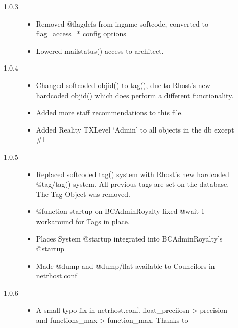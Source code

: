 \documentclass[letterpaper,10pt,english]{sphinxmanual}
\begin{document}
\begin{description}
\begin{description}
\begin{itemize}
\end{itemize}

\item[{1.0.3}] \leavevmode\begin{itemize}
\item {} 
\sphinxAtStartPar
Removed @flagdefs from in\sphinxhyphen{}game softcode, converted to flag\_access\_*
config options

\item {} 
\sphinxAtStartPar
Lowered mailstatus() access to architect.

\end{itemize}

\item[{1.0.4}] \leavevmode\begin{itemize}
\item {} 
\sphinxAtStartPar
Changed softcoded objid() to tag(), due to Rhost’s new hardcoded
objid() which does perform a different functionality.

\item {} 
\sphinxAtStartPar
Added more staff recommendations to this file.

\item {} 
\sphinxAtStartPar
Added Reality TXLevel ‘Admin’ to all objects in the db except \#1

\end{itemize}

\item[{1.0.5}] \leavevmode\begin{itemize}
\item {} 
\sphinxAtStartPar
Replaced softcoded tag() system with Rhost’s new hardcoded @tag/tag()
system. All previous tags are set on the database. The Tag Object
was removed.

\item {} 
\sphinxAtStartPar
@function startup on BC\sphinxhyphen{}Admin\sphinxhyphen{}Royalty fixed \sphinxhyphen{} @wait 1 workaround for
Tags in place.

\item {} 
\sphinxAtStartPar
Places System @startup integrated into BC\sphinxhyphen{}Admin\sphinxhyphen{}Royalty’s @startup

\item {} 
\sphinxAtStartPar
Made @dump and @dump/flat available to Councilors in netrhost.conf

\end{itemize}

\item[{1.0.6}] \leavevmode\begin{itemize}
\item {} 
\sphinxAtStartPar
A small typo fix in netrhost.conf. float\_preciiosn \sphinxhyphen{}\textgreater{} precision and
functions\_max \sphinxhyphen{}\textgreater{} function\_max. Thanks to 

\end{itemize}

\end{description}

\end{description}
\end{document}
